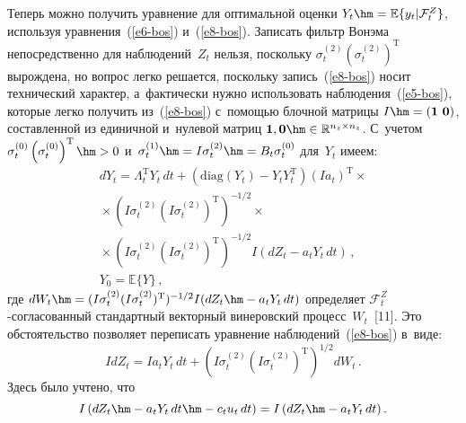 \begin{multicols}{2}
     Теперь можно получить уравнение для оптимальной оценки $Y_t\hm= 
\mathbb{E}\{ y_t\vert \mathcal{F}_t^Z\}$, используя уравнения~(\ref{e6-bos}) 
и~(\ref{e8-bos}). Записать фильтр Вонэма непосредственно для 
наблюдений~$Z_t$ нельзя, поскольку $\sigma_t^{(2)} 
\left(\sigma_t^{(2)}\right)^{\mathrm{T}}$ вырождена, но вопрос легко решается, 
поскольку запись~(\ref{e8-bos}) носит технический характер, а~фактически 
нужно использовать наблюдения~(\ref{e5-bos}), которые легко получить 
из~(\ref{e8-bos}) с~помощью блочной матрицы $I\hm= (\mathbf{1}\ 
\mathbf{0})$, составленной из единичной и~нулевой матриц $\mathbf{1}, 
\mathbf{0}\hm\in \mathbb{R}^{n_z\times n_z}$. С~учетом $\sigma_t^{(0)} 
\left( \sigma_t^{(0)}\right)^{\mathrm{T}}\hm>0$ и~$\sigma_t^{(1)}\hm= I\sigma_t^{(2)} 
\hm= B_t\sigma_t^{(0)}$ для~$Y_t$ имеем:
     \begin{multline*}
     dY_t=\Lambda_t^{\mathrm{T}} Y_t\,dt +\left( \mathrm{diag} \left(Y_t\right)-Y_t Y_t^{\mathrm{T}}\right) 
\left(Ia_t\right)^{\mathrm{T}}\times{}\\
{}\times \left( I\sigma_t^{(2)} \left(I\sigma_t^{(2)}\right)^{\mathrm{T}}  
\right)^{-1/2}\times{}\\
     {}\times \left( I\sigma_t^{(2)} \left( I\sigma_t^{(2)}\right)^{\mathrm{T}}\right)^{-1/2} 
I\left( dZ_t-a_tY_t\,dt\right)\,,\\
 Y_0=\mathbb{E}\{Y\}\,,
     \end{multline*}
где $dW_t\hm= (I\sigma_t^{(2)} (I\sigma_t^{(2)})^{\mathrm{T}})^{-1/2} I(dZ_t\hm- a_t Y_t\, 
dt)$ определяет $\mathcal{F}_t^Z$-со\-гла\-со\-ван\-ный стандартный 
векторный винеровский процесс~$W_t$~[11]. Это обстоятельство позволяет 
переписать уравнение наблюдений~(\ref{e8-bos}) в~виде:
$$
IdZ_t=Ia_t Y_t\,dt+\left( I\sigma_t^{(2)} \left( 
I\sigma_t^{(2)} \right)^{\mathrm{T}} \right)^{1/2} dW_t\,.
$$
Здесь было учтено, что 
$$
I\left(dZ_t \hm-a_t Y_t \,dt \hm- c_t u_t\, dt\right)= 
I\left(dZ_t\hm- a_t Y_t \,dt\right).
$$
     

\end{multicols}
